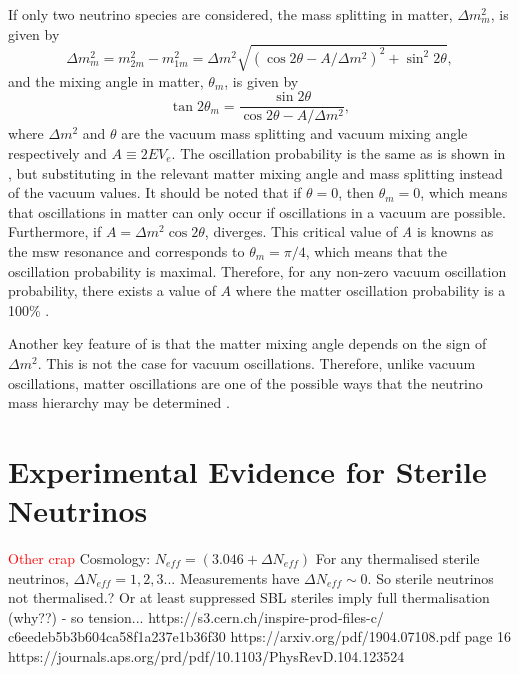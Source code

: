 If only two neutrino species are considered, the mass splitting in matter, $\Delta m^2_m$, is given by 
\begin{equation}
    \Delta m_m^2 = m_{2m}^2 - m_{1m}^2 = \Delta m^2 \sqrt{(\cos{2\theta} - A/\Delta m^2)^2 + \sin^2{2\theta}},
\end{equation}
and the mixing angle in matter, $\theta_m$, is given by
\begin{equation}
    \tan{2\theta_m} = \frac{\sin{2\theta}}{\cos{2\theta} - A/\Delta m^2},
    \label{eqn:matter_mixing_angle}
\end{equation}
where $\Delta m^2$ and $\theta$ are the vacuum mass splitting and vacuum mixing angle respectively and $A \equiv 2EV_e$. The oscillation probability is the same as is shown in , but substituting in the relevant matter mixing angle and mass splitting instead of the vacuum values. It should be noted that if $\theta = 0$, then $\theta_m = 0$, which means that oscillations in matter can only occur if oscillations in a vacuum are possible. Furthermore, if $A = \Delta m^2\cos{2\theta}$,  diverges. This critical value of \textit{A} is knowns as the \gls{msw} resonance and corresponds to $\theta_m = \pi/4$, which means that the oscillation probability is maximal. Therefore, for any non-zero vacuum oscillation probability, there exists a value of $A$ where the matter oscillation probability is a 100\% \cite{PDG_2022}. 

Another key feature of  is that the matter mixing angle depends on the sign of $\Delta m^2$. This is not the case for vacuum oscillations. Therefore, unlike vacuum oscillations, matter oscillations are one of the possible ways that the neutrino mass hierarchy may be determined \cite{mass_hierarchy_discussion}. 

\newpage
\section{Experimental Evidence for Sterile Neutrinos}\label{subchap:Motivation for Sterile Neutrinos}

\textcolor{red}{Other crap}
Cosmology: $N_{eff} = (3.046 + \Delta N_{eff})$
For any thermalised sterile neutrinos, $\Delta N_{eff} = 1, 2, 3 ...$
Measurements have $\Delta N_{eff} \sim 0$. 
So sterile neutrinos not thermalised.? Or at least suppressed
SBL steriles imply full thermalisation (why??) - so tension...
https://s3.cern.ch/inspire-prod-files-c/
c6eedeb5b3b604ca58f1a237e1b36f30
https://arxiv.org/pdf/1904.07108.pdf page 16
https://journals.aps.org/prd/pdf/10.1103/PhysRevD.104.123524

